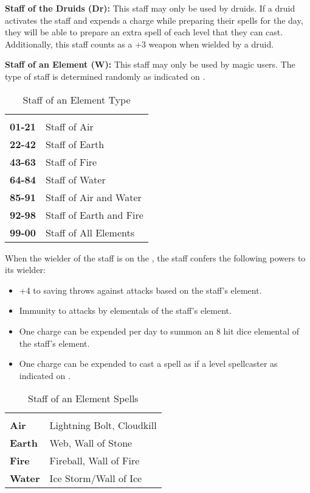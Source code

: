 \begin{multicols*}{2}
\textbf{Staff of the Druids (Dr):} This staff may only be used by druids. If a druid activates the staff and expends a charge while preparing their spells for the day, they will be able to prepare an extra spell of each level that they can cast. Additionally, this staff counts as a +3 weapon when wielded by a druid.

\textbf{Staff of an Element (W):} This staff may only be used by magic users. The type of staff is determined randomly as indicated on .

\begin {table}[H]
  \caption{Staff of an Element Type}\label{tab:Staff of an Element Type}
  \begin{tabularx}{\columnwidth}{>{\bfseries}YY}
	 & \\
	01-21 & Staff of Air\\
	22-42 & Staff of Earth\\
	43-63 & Staff of Fire\\
	64-84 & Staff of Water\\
	85-91 & Staff of Air and Water\\
	92-98 & Staff of Earth and Fire\\
	99-00 & Staff of All Elements
  \end {tabularx}
\end {table}

When the wielder of the staff is on the , the staff confers the following powers to its wielder:

\begin{itemize}
 \item{+4 to saving throws against attacks based on the staff’s element.}
 \item{Immunity to attacks by elementals of the staff’s element.}
 \item{One charge can be expended per day to summon an 8 hit dice elemental of the staff’s element.}
 \item{One charge can be expended to cast a spell as if a  level spellcaster as indicated on .}
\end{itemize}

\begin {table}[H]
  \caption{Staff of an Element Spells}\label{tab:Staff of an Element Spells}
  \begin{tabularx}{\columnwidth}{>{\bfseries}YY}
	 & \\
	Air & Lightning Bolt, Cloudkill\\
	Earth & Web, Wall of Stone\\
	Fire & Fireball, Wall of Fire\\
	Water & Ice Storm/Wall of Ice
  \end {tabularx}
\end {table}


\end{multicols*}
